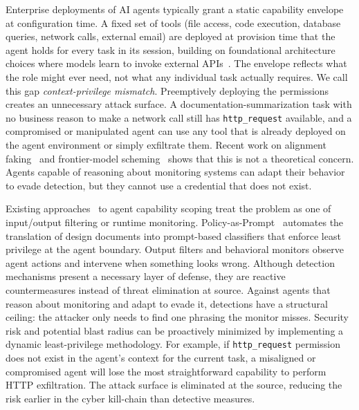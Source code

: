 \documentclass{article}
\theoremstyle{plain}
\theoremstyle{definition}
\theoremstyle{remark}
\begin{document}
Enterprise deployments of AI agents typically grant a static capability envelope at configuration time. A fixed set of tools (file access, code execution, database queries, network calls, external email) are deployed at provision time that the agent holds for every task in its session, building on foundational architecture choices where models learn to invoke external APIs~\citep{schick2023toolformer, yaoetal2022react}. The envelope reflects what the role might ever need, not what any individual task actually requires. We call this gap \emph{context-privilege mismatch}. Preemptively deploying the permissions creates an unnecessary attack surface. A documentation-summarization task with no business reason to make a network call still has \texttt{http\_request} available, and a compromised or manipulated agent can use any tool that is already deployed on the agent environment or simply exfiltrate them. Recent work on alignment faking~\citep{greenblatt2024alignment} and frontier-model scheming~\citep{apollo2024scheming} shows that this is not a theoretical concern. Agents capable of reasoning about monitoring systems can adapt their behavior to evade detection, but they cannot use a credential that does not exist.

Existing approaches~\citep{inan2023llamaguard, rebedea2023nemo} to agent capability scoping treat the problem as one of input/output filtering or runtime monitoring. Policy-as-Prompt~\citep{kholkar2025policyasprompt} automates the translation of design documents into prompt-based classifiers that enforce least privilege at the agent boundary. Output filters and behavioral monitors observe agent actions and intervene when something looks wrong. Although detection mechanisms present a necessary layer of defense, they are reactive countermeasures instead of threat elimination at source. Against agents that reason about monitoring and adapt to evade it, detections have a structural ceiling: the attacker only needs to find one phrasing the monitor misses. Security risk and potential blast radius can be proactively minimized by implementing a dynamic least-privilege methodology. For example, if \texttt{http\_request} permission does not exist in the agent's context for the current task, a misaligned or compromised agent will lose the most straightforward capability to perform HTTP exfiltration. The attack surface is eliminated at the source, reducing the risk earlier in the cyber kill-chain than detective measures.
\end{document}
